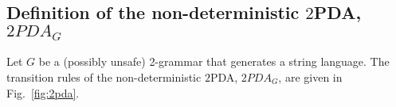 \subsection{Definition of the non-deterministic $2$PDA, $2PDA_G$}
Let $G$ be a (possibly unsafe) 2-grammar that generates a string
language. The transition rules of the non-deterministic $2$PDA,
$2PDA_G$, are given in Fig.~\ref{fig:2pda}.
